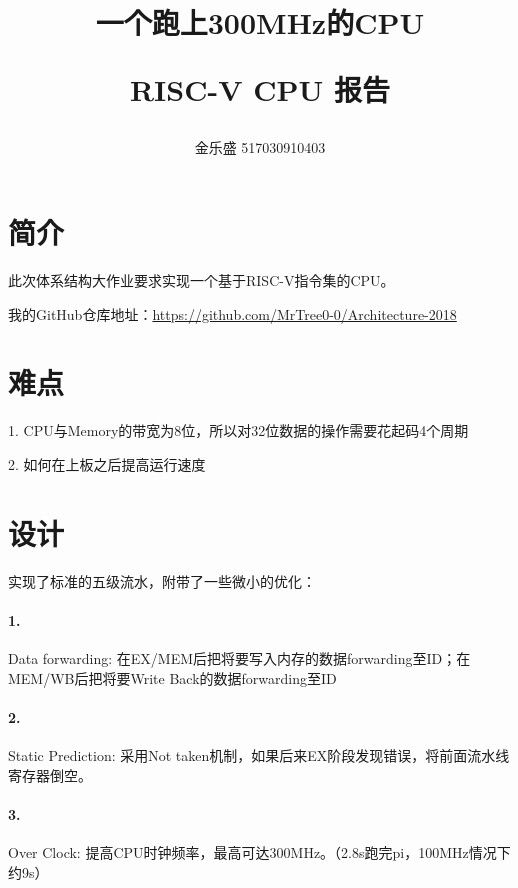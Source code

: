 \documentclass[a4paper,10pt,oneside]{article}
\begin{document}
\title{一个跑上300MHz的CPU\\[2ex]\begin{large} RISC-V CPU 报告\end{large}}
\author{金乐盛 517030910403}
\maketitle

\section{简介}
此次体系结构大作业要求实现一个基于RISC-V指令集的CPU。

我的GitHub仓库地址：\url{https://github.com/MrTree0-0/Architecture-2018}

\section{难点}
1. CPU与Memory的带宽为8位，所以对32位数据的操作需要花起码4个周期

2. 如何在上板之后提高运行速度

\section{设计}
实现了标准的五级流水，附带了一些微小的优化：
\paragraph{1.} Data forwarding: 在EX/MEM后把将要写入内存的数据forwarding至ID；在MEM/WB后把将要Write Back的数据forwarding至ID

\paragraph{2.} Static Prediction: 采用Not taken机制，如果后来EX阶段发现错误，将前面流水线寄存器倒空。

\paragraph{3.} Over Clock: 提高CPU时钟频率，最高可达300MHz。（2.8s跑完pi，100MHz情况下约9s）
\end{document}
